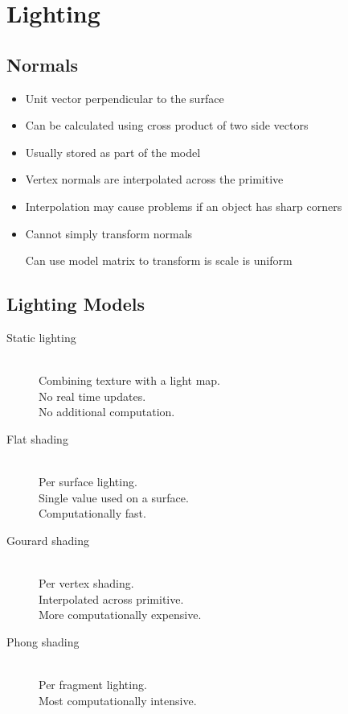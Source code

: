 \documentclass[a4paper]{article}
\begin{document}
\section{Lighting}

\subsection{Normals}

\begin{itemize}
  \item
    Unit vector perpendicular to the surface

  \item
    Can be calculated using cross product of two side vectors

  \item
    Usually stored as part of the model

  \item
    Vertex normals are interpolated across the primitive

  \item
    Interpolation may cause problems if an object has sharp corners

  \item
    Cannot simply transform normals

    Can use model matrix to transform is scale is uniform

\end{itemize}

\subsection{Lighting Models}

\begin{description}
  \item[Static lighting] \hfill \\
    Combining texture with a light map. \\
    No real time updates. \\
    No additional computation.

  \item[Flat shading] \hfill \\
    Per surface lighting. \\
    Single value used on a surface. \\
    Computationally fast.

  \item[Gourard shading] \hfill \\
    Per vertex shading. \\
    Interpolated across primitive. \\
    More computationally expensive.

  \item[Phong shading] \hfill \\
    Per fragment lighting. \\
    Most computationally intensive.

\end{description}
\end{document}
